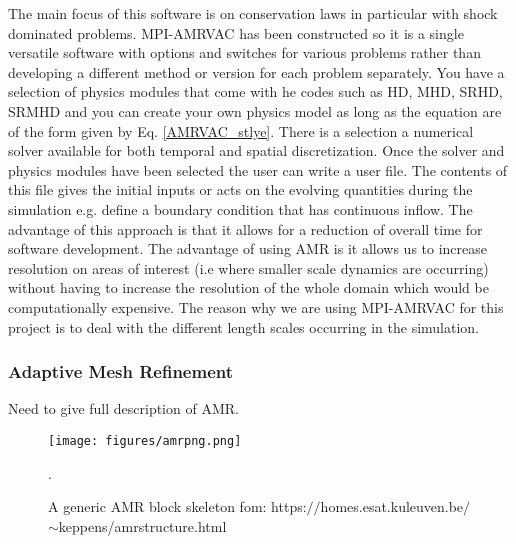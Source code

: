 \documentclass[12pt]{ociamthesis}
\begin{document}
The main focus of this software is on conservation laws in particular with shock dominated problems. MPI-AMRVAC has been constructed so it is a single versatile software with options and switches for various problems rather than developing a different method or version for each problem separately. You have a selection of physics modules that come with he codes such as HD, MHD, SRHD, SRMHD and you can create your own physics model as long as the equation are of the form given by Eq. \eqref{AMRVAC_stlye}. There is a selection a numerical solver available for both temporal and spatial discretization. Once the solver and physics modules have been selected the user can write a user file. The contents of this file gives the initial inputs or acts on the evolving quantities during the simulation e.g. define a boundary condition that has continuous inflow. The advantage of this approach is that it allows for a reduction of overall time for software development. The advantage of using AMR is it allows us to increase resolution on areas of interest (i.e where smaller scale dynamics are occurring) without having to increase the resolution of the whole domain which would be computationally expensive. The reason why we are using MPI-AMRVAC for this project is to deal with the different length scales occurring in the simulation.
\subsubsection{Adaptive Mesh Refinement}
Need to give full description of AMR. 
\begin{figure}
\centering
\texttt{[image: figures/amrpng.png]}
\caption{A generic AMR block skeleton fom: https:$//$homes.esat.kuleuven.be$/$ $\sim$keppens/amrstructure.html}.
\label{amr_scheme}
\end{figure}   
\end{document}
